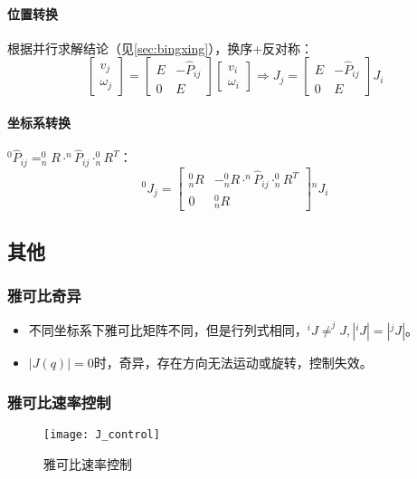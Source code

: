 \documentclass[
12pt, %
a4paper, 
oneside, %
headinclude,footinclude, %
]{scrartcl}
\begin{document}
\paragraph{位置转换}
根据并行求解结论（见\ref{sec:bingxing}），换序+反对称：
$$ 
\begin{bmatrix} v_j \\ \omega_j \end{bmatrix} 
=
\begin{bmatrix} E & -\hat{P}_{ij} \\ 0 & E \end{bmatrix}
\begin{bmatrix} v_i \\ \omega_i \end{bmatrix} 
\Rightarrow 
J_j = \begin{bmatrix} E & -\hat{P}_{ij} \\ 0 & E \end{bmatrix} J_i
$$ 
\paragraph{坐标系转换}
$ ^0\hat{P}_{ij} = ^0_n R \cdot ^n\hat{P}_{ij} \cdot ^0_n R^T $：
$$ ^0 J_j = \begin{bmatrix} ^0_n R & -^0_n R \cdot ^n\hat{P}_{ij} \cdot ^0_n R^T \\ 0 & ^0_n R \end{bmatrix} {}^n J_i $$
\subsection{其他}
\subsubsection{雅可比奇异}
\begin{itemize}
\item 不同坐标系下雅可比矩阵不同，但是行列式相同，$ ^i J \neq ^j J, |^i J| = |^j J| $。
\item $ |J(q)| = 0 $时，奇异，存在方向无法运动或旋转，控制失效。
\end{itemize} 
\subsubsection{雅可比速率控制}
\begin{figure}[H]
\centering 
\texttt{[image: J\_control]} 
\caption[雅可比速率控制]{雅可比速率控制}
\end{figure}
\end{document}
